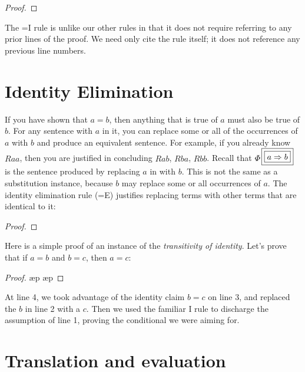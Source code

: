 \begin{proof}
	 
\end{proof}

The {=}I rule is unlike our other rules in that it does not require referring to any prior lines of the proof. We need only cite the rule itself; it does not reference any previous line numbers.

\section{Identity Elimination}

If you have shown that $a{=}b$, then anything that is true of $a$ must also be true of $b$. For any sentence with $a$ in it, you can replace some or all of the occurrences of $a$ with $b$ and produce an equivalent sentence. For example, if you already know $Raa$, then you are justified in concluding $Rab$, $Rba$, $Rbb$. Recall that $\metaA{}\substitutesome{a}{b}$ is the sentence produced by replacing $a$ in \metaA{} with $b$. This is not the same as a substitution instance, because $b$ may replace some or all occurrences of $a$. The identity elimination rule ({=}E) justifies replacing terms with other terms that are identical to it:
\begin{proof}
	 
	 
\end{proof}

Here is a simple proof of an instance of the \emph{transitivity of identity}. Let's prove that if $a{=}b$ and $b{=}c$, then $a{=}c$:

\begin{proof}
	\open
		\ae{p}
		\ae{p}
	\close
	 
\end{proof}

At line 4, we took advantage of the identity claim $b{=}c$ on line 3, and replaced the $b$ in line 2 with a $c$. Then we used the familiar \eif{}I rule to discharge the assumption of line 1, proving the conditional we were aiming for.


\section{Translation and evaluation}

